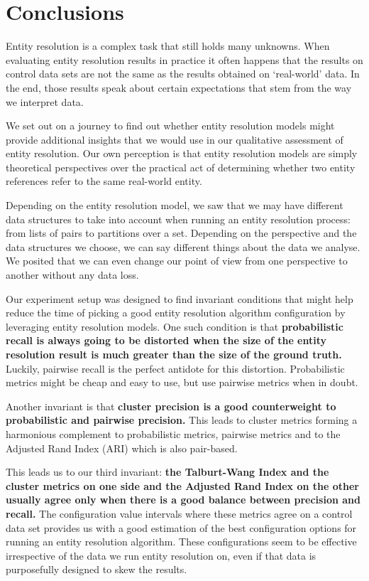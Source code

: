\documentclass[journal]{IEEEtran}
\begin{document}
    \section{Conclusions}\label{sec:Conclusions}

    Entity resolution is a complex task that still holds many unknowns.
    When evaluating entity resolution results in practice it often happens that
    the results on control data sets are not the same as the results obtained
    on `real-world' data.
    In the end, those results speak about certain expectations that stem from
    the way we interpret data.

    We set out on a journey to find out whether entity resolution models might
    provide additional insights that we would use in our qualitative assessment
    of entity resolution.
    Our own perception is that entity resolution models are simply theoretical
    perspectives over the practical act of determining whether two entity
    references refer to the same real-world entity.

    Depending on the entity resolution model, we saw that we may have different
    data structures to take into account when running an entity resolution
    process: from lists of pairs to partitions over a set.
    Depending on the perspective and the data structures we choose, we can say
    different things about the data we analyse.
    We posited that we can even change our point of view from one perspective to
    another without any data loss.

    Our experiment setup was designed to find invariant conditions that might
    help reduce the time of picking a good entity resolution algorithm
    configuration by leveraging entity resolution models.
    One such condition is that \textbf{probabilistic recall is always going to
    be distorted when the size of the entity resolution result is much greater
    than the size of the ground truth.}
    Luckily, pairwise recall is the perfect antidote for this distortion.
    Probabilistic metrics might be cheap and easy to use, but use pairwise
    metrics when in doubt.

    Another invariant is that \textbf{cluster precision is a good counterweight
    to probabilistic and pairwise precision.}
    This leads to cluster metrics forming a harmonious complement to
    probabilistic metrics, pairwise metrics and to the Adjusted Rand Index (ARI)
    which is also pair-based.
    
    This leads us to our third invariant: \textbf{the Talburt-Wang Index and the
    cluster metrics on one side and the Adjusted Rand Index on the other usually
    agree only when there is a good balance between precision and recall.}
    The configuration value intervals where these metrics agree on a control
    data set provides us with a good estimation of the best configuration
    options for running an entity resolution algorithm.
    These configurations seem to be effective irrespective of the data we run
    entity resolution on, even if that data is purposefully designed to skew the
    results.
\end{document}
